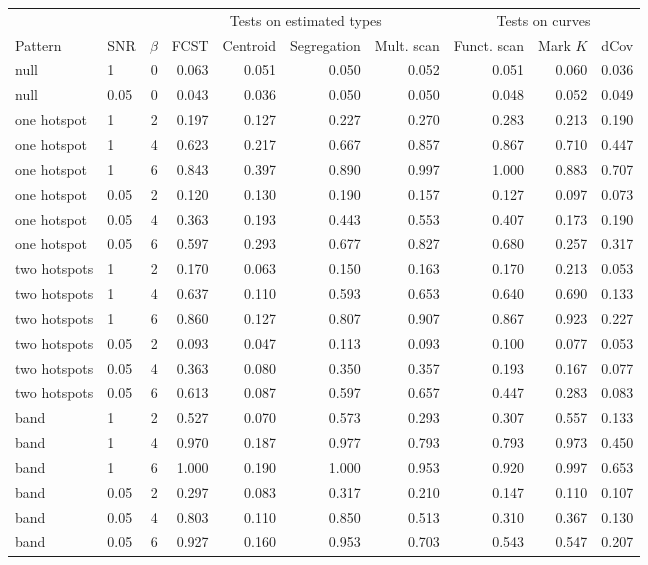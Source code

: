 \begin{tabular}{llr|rrrr|rrr}
\toprule
 & & & \multicolumn{4}{c|}{Tests on estimated types} & \multicolumn{3}{c}{Tests on curves} \\
Pattern & SNR & $\beta$ & FCST & Centroid & Segregation & Mult. scan & Funct. scan & Mark $K$ & dCov \\
\midrule
null & 1 & 0 & 0.063 & 0.051 & 0.050 & 0.052 & 0.051 & 0.060 & 0.036 \\
null & 0.05 & 0 & 0.043 & 0.036 & 0.050 & 0.050 & 0.048 & 0.052 & 0.049 \\
\midrule
one hotspot & 1 & 2 & 0.197 & 0.127 & 0.227 & 0.270 & 0.283 & 0.213 & 0.190 \\
one hotspot & 1 & 4 & 0.623 & 0.217 & 0.667 & 0.857 & 0.867 & 0.710 & 0.447 \\
one hotspot & 1 & 6 & 0.843 & 0.397 & 0.890 & 0.997 & 1.000 & 0.883 & 0.707 \\
one hotspot & 0.05 & 2 & 0.120 & 0.130 & 0.190 & 0.157 & 0.127 & 0.097 & 0.073 \\
one hotspot & 0.05 & 4 & 0.363 & 0.193 & 0.443 & 0.553 & 0.407 & 0.173 & 0.190 \\
one hotspot & 0.05 & 6 & 0.597 & 0.293 & 0.677 & 0.827 & 0.680 & 0.257 & 0.317 \\
\midrule
two hotspots & 1 & 2 & 0.170 & 0.063 & 0.150 & 0.163 & 0.170 & 0.213 & 0.053 \\
two hotspots & 1 & 4 & 0.637 & 0.110 & 0.593 & 0.653 & 0.640 & 0.690 & 0.133 \\
two hotspots & 1 & 6 & 0.860 & 0.127 & 0.807 & 0.907 & 0.867 & 0.923 & 0.227 \\
two hotspots & 0.05 & 2 & 0.093 & 0.047 & 0.113 & 0.093 & 0.100 & 0.077 & 0.053 \\
two hotspots & 0.05 & 4 & 0.363 & 0.080 & 0.350 & 0.357 & 0.193 & 0.167 & 0.077 \\
two hotspots & 0.05 & 6 & 0.613 & 0.087 & 0.597 & 0.657 & 0.447 & 0.283 & 0.083 \\
\midrule
band & 1 & 2 & 0.527 & 0.070 & 0.573 & 0.293 & 0.307 & 0.557 & 0.133 \\
band & 1 & 4 & 0.970 & 0.187 & 0.977 & 0.793 & 0.793 & 0.973 & 0.450 \\
band & 1 & 6 & 1.000 & 0.190 & 1.000 & 0.953 & 0.920 & 0.997 & 0.653 \\
band & 0.05 & 2 & 0.297 & 0.083 & 0.317 & 0.210 & 0.147 & 0.110 & 0.107 \\
band & 0.05 & 4 & 0.803 & 0.110 & 0.850 & 0.513 & 0.310 & 0.367 & 0.130 \\
band & 0.05 & 6 & 0.927 & 0.160 & 0.953 & 0.703 & 0.543 & 0.547 & 0.207 \\
\bottomrule
\end{tabular}
